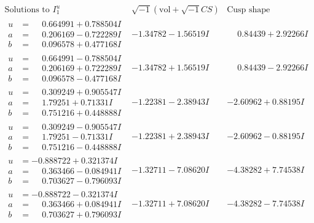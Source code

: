 \documentclass[1p]{elsarticle_modified}
\theoremstyle{definition}
\newcommand{\I}{\sqrt{-1}}
\begin{document}
$$\begin{array}{c|c|c}  
\text{Solutions to }I^u_{1}& \I (\text{vol} + \sqrt{-1}CS) & \text{Cusp shape}\\
 \hline 
\begin{aligned}
u &= \phantom{-}0.664991 + 0.788504 I \\
a &= \phantom{-}0.206169 - 0.722289 I \\
b &= \phantom{-}0.096578 + 0.477168 I\end{aligned}
 & -1.34782 - 1.56519 I & \phantom{-}0.84439 + 2.92266 I \\ \hline\begin{aligned}
u &= \phantom{-}0.664991 - 0.788504 I \\
a &= \phantom{-}0.206169 + 0.722289 I \\
b &= \phantom{-}0.096578 - 0.477168 I\end{aligned}
 & -1.34782 + 1.56519 I & \phantom{-}0.84439 - 2.92266 I \\ \hline\begin{aligned}
u &= \phantom{-}0.309249 + 0.905547 I \\
a &= \phantom{-}1.79251 + 0.71331 I \\
b &= \phantom{-}0.751216 + 0.448888 I\end{aligned}
 & -1.22381 - 2.38943 I & -2.60962 + 0.88195 I \\ \hline\begin{aligned}
u &= \phantom{-}0.309249 - 0.905547 I \\
a &= \phantom{-}1.79251 - 0.71331 I \\
b &= \phantom{-}0.751216 - 0.448888 I\end{aligned}
 & -1.22381 + 2.38943 I & -2.60962 - 0.88195 I \\ \hline\begin{aligned}
u &= -0.888722 + 0.321374 I \\
a &= \phantom{-}0.363466 - 0.084941 I \\
b &= \phantom{-}0.703627 - 0.796093 I\end{aligned}
 & -1.32711 - 7.08620 I & -4.38282 + 7.74538 I \\ \hline\begin{aligned}
u &= -0.888722 - 0.321374 I \\
a &= \phantom{-}0.363466 + 0.084941 I \\
b &= \phantom{-}0.703627 + 0.796093 I\end{aligned}
 & -1.32711 + 7.08620 I & -4.38282 - 7.74538 I \\ \hline\begin{aligned}

\end{aligned}
\end{array}$$
\end{document}
